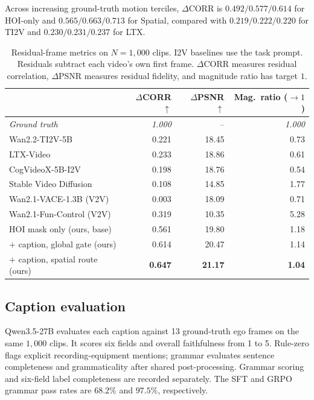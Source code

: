 \documentclass{article} %
\begin{document}
Across increasing ground-truth motion terciles, $\Delta$CORR is
$0.492/0.577/0.614$ for HOI-only and $0.565/0.663/0.713$ for Spatial,
compared with $0.219/0.222/0.220$ for TI2V and
$0.230/0.231/0.237$ for LTX.

\begin{table}[h]
\centering
\footnotesize
\captionsetup{font=footnotesize}
\caption{Residual-frame metrics on $N{=}1{,}000$ clips.
I2V baselines use the task prompt. Residuals subtract each video's own
first frame. $\Delta$CORR measures residual correlation, $\Delta$PSNR
measures residual fidelity, and magnitude ratio has target $1$.}
\label{tab:delta}
\begin{tabular}{lrrr}
\toprule
 & $\Delta$CORR $\uparrow$ & $\Delta$PSNR $\uparrow$ & Mag.\ ratio ($\to\!1$) \\
\midrule
\emph{Ground truth} & \emph{1.000} & -- & \emph{1.000} \\
\midrule
Wan2.2-TI2V-5B            & 0.221 & 18.45 & 0.73 \\
LTX-Video                 & 0.233 & 18.86 & 0.61 \\
CogVideoX-5B-I2V          & 0.198 & 18.76 & 0.54 \\
Stable Video Diffusion    & 0.108 & 14.85 & 1.77 \\
Wan2.1-VACE-1.3B (V2V)    & 0.003 & 18.09 & 0.71 \\
Wan2.1-Fun-Control (V2V)  & 0.319 & 10.35 & 5.28 \\
\midrule
HOI mask only (ours, base)        & 0.561 & 19.80 & 1.18 \\
$+$ caption, global gate (ours)   & 0.614 & 20.47 & 1.14 \\
$+$ caption, spatial route (ours) & \textbf{0.647} & \textbf{21.17} & \textbf{1.04} \\
\bottomrule
\end{tabular}
\end{table}

\subsection{Caption evaluation}
Qwen3.5-27B evaluates each caption against 13 ground-truth ego frames
on the same $1{,}000$ clips. It scores six fields and overall faithfulness
from 1 to 5. Rule-zero flags explicit recording-equipment mentions;
grammar evaluates sentence completeness and grammaticality after shared
post-processing. Grammar scoring and six-field label completeness are
recorded separately. The SFT and GRPO grammar pass rates are $68.2\%$
and $97.5\%$, respectively.
\end{document}
